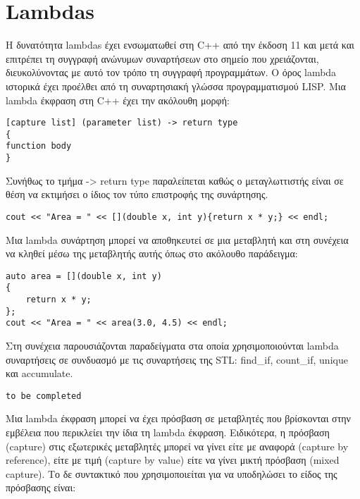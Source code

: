 



\section{Lambdas}
Η δυνατότητα lambdas έχει ενσωματωθεί στη C++ από την έκδοση 11 και μετά και επιτρέπει τη συγγραφή ανώνυμων συναρτήσεων στο σημείο που χρειάζονται, διευκολύνοντας με αυτό τον τρόπο τη συγγραφή προγραμμάτων. O όρος lambda ιστορικά έχει προέλθει από τη συναρτησιακή γλώσσα προγραμματισμού LISP. Μια lambda έκφραση στη C++ έχει την ακόλουθη μορφή:

\begin{lstlisting}[style=DOS]
[capture list] (parameter list) -> return type 
{
function body
}
\end{lstlisting}

Συνήθως το τμήμα -> return type παραλείπεται καθώς ο μεταγλωττιστής είναι σε θέση να εκτιμήσει ο ίδιος τον τύπο επιστροφής της συνάρτησης. 

\begin{lstlisting}[style=DOS]
cout << "Area = " << [](double x, int y){return x * y;} << endl;
\end{lstlisting}

Μια lambda συνάρτηση μπορεί να αποθηκευτεί σε μια μεταβλητή και στη συνέχεια να κληθεί μέσω της μεταβλητής αυτής όπως στο ακόλουθο παράδειγμα:

\begin{lstlisting}[style=DOS]
auto area = [](double x, int y)
{
	return x * y;
};
cout << "Area = " << area(3.0, 4.5) << endl;
\end{lstlisting}

Στη συνέχεια παρουσιάζονται παραδείγματα στα οποία χρησιμοποιούνται lambda συναρτήσεις σε συνδυασμό με τις συναρτήσεις της STL: find\_if, count\_if, unique και accumulate.

\begin{lstlisting}[style=DOS]
to be completed
\end{lstlisting}

Μια lambda έκφραση μπορεί να έχει πρόσβαση σε μεταβλητές που βρίσκονται στην εμβέλεια που περικλείει την ίδια τη lambda έκφραση. Ειδικότερα, η πρόσβαση (capture) στις εξωτερικές μεταβλητές μπορεί να γίνει είτε με αναφορά (capture by reference), είτε με τιμή (capture by value) είτε να γίνει μικτή πρόσβαση (mixed capture). Το δε συντακτικό που χρησιμοποιείται για να υποδηλώσει το είδος της πρόσβασης είναι:

